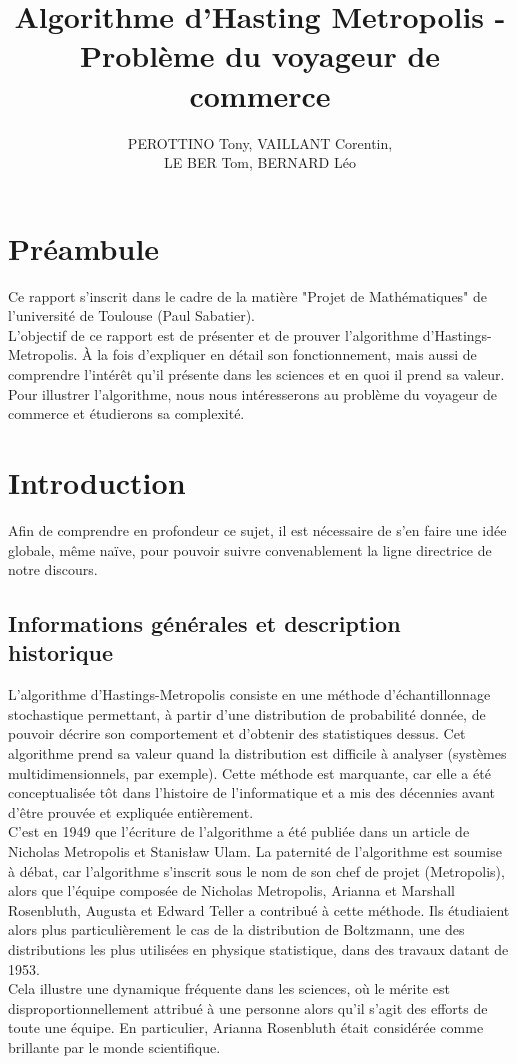 \documentclass{article}
\title{Algorithme d'Hasting Metropolis - Problème du voyageur de commerce}
\author{PEROTTINO Tony, VAILLANT Corentin, \\ LE BER Tom, BERNARD Léo}
\begin{document}
\maketitle

\newpage
\tableofcontents
\newpage

\section*{Préambule}

Ce rapport s'inscrit dans le cadre de la matière "Projet de Mathématiques" de l'université de Toulouse (Paul Sabatier). \\
L'objectif de ce rapport est de présenter et de prouver l'algorithme d'Hastings-Metropolis. À la fois d'expliquer en détail son fonctionnement, mais aussi de comprendre l'intérêt qu'il présente dans les sciences et en quoi il prend sa valeur. \\
Pour illustrer l'algorithme, nous nous intéresserons au problème du voyageur de commerce et étudierons sa complexité.


\section{Introduction}

Afin de comprendre en profondeur ce sujet, il est nécessaire de s'en faire une idée globale, même naïve, pour pouvoir suivre convenablement la ligne directrice de notre discours.

\subsection{Informations générales et description historique}

L'algorithme d'Hastings-Metropolis consiste en une méthode d'échantillonnage stochastique permettant, à partir d'une distribution de probabilité donnée, de pouvoir décrire son comportement et d'obtenir des statistiques dessus. Cet algorithme prend sa valeur quand la distribution est difficile à analyser (systèmes multidimensionnels, par exemple). Cette méthode est marquante, car elle a été conceptualisée tôt dans l'histoire de l'informatique et a mis des décennies avant d'être prouvée et expliquée entièrement. \\
C'est en 1949 que l'écriture de l'algorithme a été publiée dans un article de Nicholas Metropolis et Stanisław Ulam. La paternité de l'algorithme est soumise à débat, car l'algorithme s'inscrit sous le nom de son chef de projet (Metropolis), alors que l'équipe composée de Nicholas Metropolis, Arianna et Marshall Rosenbluth, Augusta et Edward Teller a contribué à cette méthode. Ils étudiaient alors plus particulièrement le cas de la distribution de Boltzmann, une des distributions les plus utilisées en physique statistique, dans des travaux datant de 1953. \\
Cela illustre une dynamique fréquente dans les sciences, où le mérite est disproportionnellement attribué à une personne alors qu'il s'agit des efforts de toute une équipe. En particulier, Arianna Rosenbluth était considérée comme brillante par le monde scientifique. \\
\end{document}
